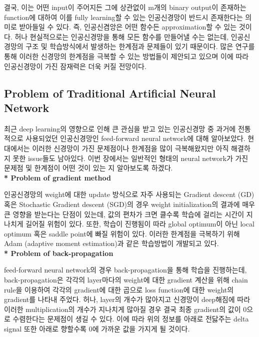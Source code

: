 \documentclass[draft=false]{oblivoir}
\begin{document}
결국, 이는 어떤 input이 주어지든 그에 상관없이 m개의 binary output이 존재하는 function에 대하여 이를 fully learning할 수 있는 인공신경망이 반드시 존재한다는 의미로 받아들일 수 있다. 즉, 인공신겸앙은 어떤 함수든 approximation할 수 있는 것이다. 허나 현실적으로는 인공신경망을 통해 모든 함수를 만들어낼 수는 없는데, 인공신경망의 구조 및 학습방식에서 발생하는 한계점과 문제들이 있기 때문이다. 많은 연구를 통해 이러한 신경망의 한계점을 극복할 수 있는 방법들이 제안되고 있으며 이에 따라 인공신경망이 가진 잠재력은 더욱 커질 전망이다.

\subsection{Problem of Traditional Artificial Neural Network}
최근 deep learning의 영향으로 인해 큰 관심을 받고 있는 인공신경망 중 과거에 전통적으로 사용되었던 인공신경망인 feed-forward neural network에 대해 알아보았다. 현대에서는 이러한 신경망이 가진 문제점이나 한계점을 많이 극복해왔지만 아직 해결하지 못한 issue들도 남아있다. 이번 장에서는 일반적인 형태의 neural network가 가진 문제점 및 한계점이 어떤 것이 있는 지 알아보도록 하겠다.\\

\textbf{* Problem of gradient method}

인공신경망의 weight에 대한 update 방식으로 자주 사용되는 Gradient descent (GD) 혹은 Stochastic Gradient descent (SGD)의 경우 weight initialization의 결과에 매우 큰 영향을 받는다는 단점이 있는데, 값의 편차가 크면 클수록 학습에 걸리는 시간이 지나치게 길어질 위험이 있다. 또한, 학습이 진행됨이 따라 global optimum이 아닌 local optimum 혹은 saddle point에 빠질 위험이 있다. 이러한 한계점을 극복하기 위해 Adam (adaptive moment estimation)과 같은 학습방법이 개발되고 있다. \\

\textbf{* Problem of back-propagation}

feed-forward neural network의 경우 back-propagation을 통해 학습을 진행하는데, back-propagation은 각각의 layer마다의 weight에 대한 gradient 계산을 위해 chain rule을 이용하여 각각의 gradient에 대한 곱으로 loss function에 대한 weight의 gradient를 나타내 주었다. 허나, layer의 개수가 많아지고 신경망이 deep해짐에 따라 이러한 multiplication의 개수가 지나치게 많아질 경우 결국 최종 gradient의 값이 0으로 수렴한다는 문제점이 생길 수 있다. 이에 따라 위의 정보를 아래로 전닳주는 delta signal 또한 아래로 향할수록 0에 가까운 값을 가지게 될 것이다. 
\end{document}
